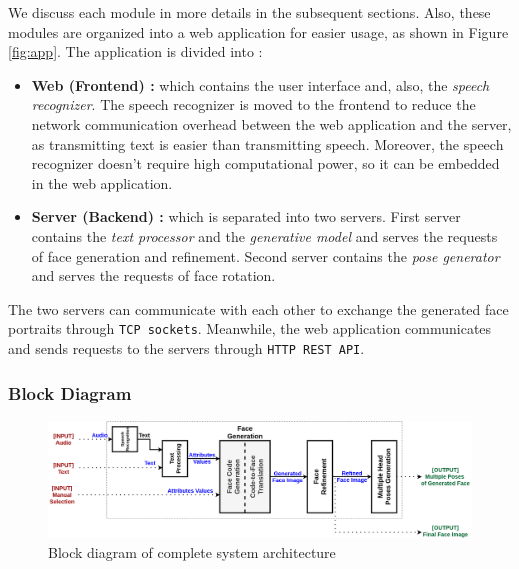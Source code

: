 We discuss each module in more details in the subsequent sections. Also, these modules are organized into a web application for easier usage, as shown in Figure \ref{fig:app}. The application is divided into :
\begin{itemize}
    \item\textbf{ Web (Frontend) :} which contains the user interface and, also, the \emph{speech recognizer}. The speech recognizer is moved to the frontend to reduce the network communication overhead between the web application and the server, as transmitting text is easier than transmitting speech. Moreover, the speech recognizer doesn't require high computational power, so it can be embedded in the web application.
    \item \textbf{Server (Backend) :} which is separated into two servers. First server contains the \emph{text processor} and the \emph{generative model} and serves the requests of face generation and refinement. Second server contains the \emph{pose generator} and serves the requests of face rotation.
\end{itemize}

\newpage

The two servers can communicate with each other to exchange the generated face portraits through \texttt{TCP sockets}. Meanwhile, the web application communicates and sends requests to the servers through \texttt{HTTP REST API}.

\subsubsection{Block Diagram}

\begin{figure}[H]
    \centering
    \includegraphics[width=\textwidth]{images/system-design.png}
    \caption{Block diagram of complete system architecture}
    \label{fig:system}
\end{figure}

